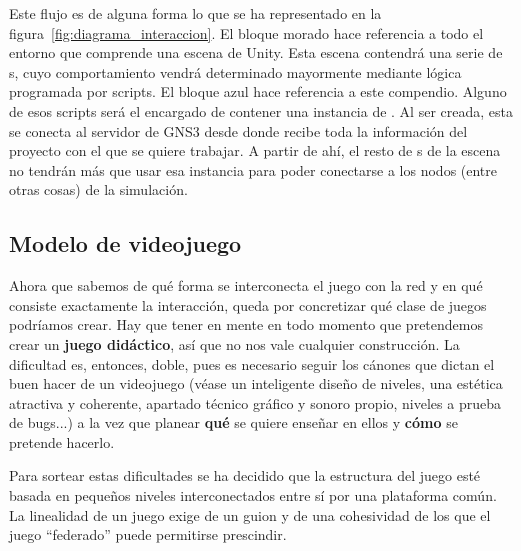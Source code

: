 Este flujo es de alguna forma lo que se ha representado en la figura~\ref{fig:diagrama_interaccion}. El bloque morado hace referencia a todo el entorno que comprende una escena de Unity. Esta escena contendrá una serie de \GAOBJ s, cuyo comportamiento vendrá determinado mayormente mediante lógica programada por scripts. El bloque azul hace referencia a este compendio. Alguno de esos scripts será el encargado de contener una instancia de \GNSCS . Al ser creada, esta se conecta al servidor de GNS3 desde donde recibe toda la información del proyecto con el que se quiere trabajar. A partir de ahí, el resto de \GAOBJ s de la escena no tendrán más que usar esa instancia para poder conectarse a los nodos (entre otras cosas) de la simulación. 

\subsection{Modelo de videojuego}
Ahora que sabemos de qué forma se interconecta el juego con la red y en qué consiste exactamente la interacción, queda por concretizar qué clase de juegos podríamos crear. Hay que tener en mente en todo momento que pretendemos crear un \textbf{juego didáctico}, así que no nos vale cualquier construcción. La dificultad es, entonces, doble, pues es necesario seguir los cánones que dictan el buen hacer de un videojuego (véase un inteligente diseño de niveles, una estética atractiva y coherente, apartado técnico gráfico y sonoro propio, niveles a prueba de bugs...) a la vez que planear \textbf{qué} se quiere enseñar en ellos y \textbf{cómo} se pretende hacerlo.

Para sortear estas dificultades se ha decidido que la estructura del juego esté basada en pequeños niveles interconectados entre sí por una plataforma común. La linealidad de un juego exige de un guion y de una cohesividad de los que el juego ``federado'' puede permitirse  prescindir.

